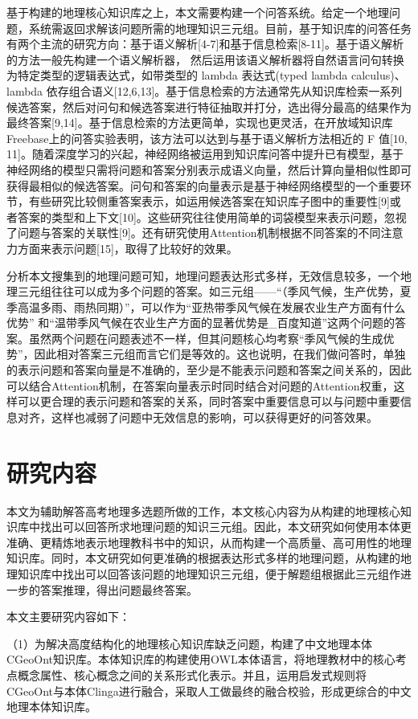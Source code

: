 基于构建的地理核心知识库之上，本文需要构建一个问答系统。给定一个地理问题，系统需返回求解该问题所需的地理知识三元组。目前，基于知识库的问答任务有两个主流的研究方向：基于语义解析[4-7]和基于信息检索[8-11]。基于语义解析的方法一般先构建一个语义解析器， 然后运用该语义解析器将自然语言问句转换为特定类型的逻辑表达式，如带类型的 lambda 表达式(typed lambda calculus)、 lambda 依存组合语义[12,6,13]。基于信息检索的方法通常先从知识库检索一系列候选答案，然后对问句和候选答案进行特征抽取并打分，选出得分最高的结果作为最终答案[9,14]。基于信息检索的方法更简单，实现也更灵活，在开放域知识库Freebase上的问答实验表明，该方法可以达到与基于语义解析方法相近的 F 值[10, 11]。随着深度学习的兴起，神经网络被运用到知识库问答中提升已有模型，基于神经网络的模型只需将问题和答案分别表示成语义向量，然后计算向量相似性即可获得最相似的候选答案。问句和答案的向量表示是基于神经网络模型的一个重要环节，有些研究比较侧重答案表示，如运用候选答案在知识库子图中的重要性[9]或者答案的类型和上下文[10]。这些研究往往使用简单的词袋模型来表示问题，忽视了问题与答案的关联性[9]。还有研究使用Attention机制根据不同答案的不同注意力方面来表示问题[15]，取得了比较好的效果。

分析本文搜集到的地理问题可知，地理问题表达形式多样，无效信息较多，一个地理三元组往往可以成为多个问题的答案。如三元组——“（季风气候，生产优势，夏季高温多雨、雨热同期）”，可以作为“亚热带季风气候在发展农业生产方面有什么优势” 和“温带季风气候在农业生产方面的显著优势是\_百度知道”这两个问题的答案。虽然两个问题在问题表述不一样，但其问题核心均考察“季风气候的生成优势”，因此相对答案三元组而言它们是等效的。这也说明，在我们做问答时，单独的表示问题和答案向量是不准确的，至少是不能表示问题和答案之间关系的，因此可以结合Attention机制，在答案向量表示时同时结合对问题的Attention权重，这样可以更合理的表示问题和答案的关系，同时答案中重要信息可以与问题中重要信息对齐，这样也减弱了问题中无效信息的影响，可以获得更好的问答效果。

\section{研究内容}
本文为辅助解答高考地理多选题所做的工作，本文核心内容为从构建的地理核心知识库中找出可以回答所求地理问题的知识三元组。因此，本文研究如何使用本体更准确、更精炼地表示地理教科书中的知识，从而构建一个高质量、高可用性的地理知识库。同时，本文研究如何更准确的根据表达形式多样的地理问题，从构建的地理知识库中找出可以回答该问题的地理知识三元组，便于解题组根据此三元组作进一步的答案推理，得出问题最终答案。

本文主要研究内容如下：

（1）为解决高度结构化的地理核心知识库缺乏问题，构建了中文地理本体CGeoOnt知识库。本体知识库的构建使用OWL本体语言，将地理教材中的核心考点概念属性、核心概念之间的关系形式化表示。并且，运用启发式规则将CGeoOnt与本体Clinga进行融合，采取人工做最终的融合校验，形成更综合的中文地理本体知识库。

